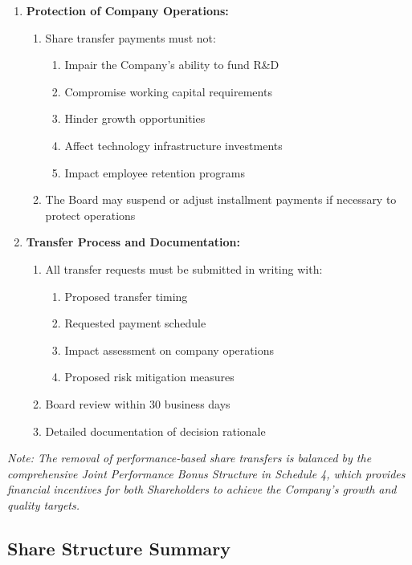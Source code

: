 \begin{enumerate}[label=(\alph*)]
\item \textbf{Protection of Company Operations:}
    \begin{enumerate}[label=(\roman*)]
    \item Share transfer payments must not:
        \begin{enumerate}[label=(\alph*)]
        \item Impair the Company's ability to fund R\&D
        \item Compromise working capital requirements
        \item Hinder growth opportunities
        \item Affect technology infrastructure investments
        \item Impact employee retention programs
        \end{enumerate}
    \item The Board may suspend or adjust installment payments if necessary to protect operations
    \end{enumerate}

\item \textbf{Transfer Process and Documentation:}
    \begin{enumerate}[label=(\roman*)]
    \item All transfer requests must be submitted in writing with:
        \begin{enumerate}[label=(\alph*)]
        \item Proposed transfer timing
        \item Requested payment schedule
        \item Impact assessment on company operations
        \item Proposed risk mitigation measures
        \end{enumerate}
    \item Board review within 30 business days
    \item Detailed documentation of decision rationale
    \end{enumerate}
\end{enumerate}

\textit{Note: The removal of performance-based share transfers is balanced by the comprehensive Joint Performance Bonus Structure in Schedule 4, which provides financial incentives for both Shareholders to achieve the Company's growth and quality targets.} 

\subsection{Share Structure Summary}

